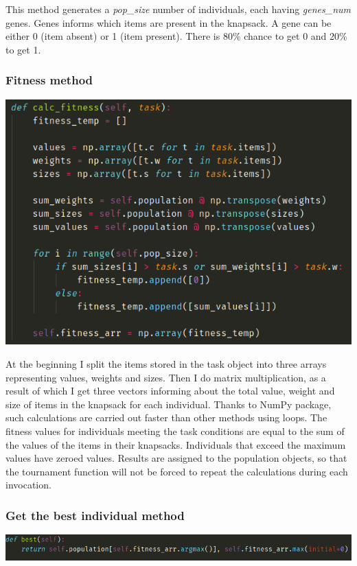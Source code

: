 \documentclass[12pt]{article}
\begin{document}
This method generates a \emph{pop\_size} number of individuals, each having \emph{genes\_num} genes. Genes informs which items are
 present in the knapsack. A gene can be either 0 (item absent) or 1 (item present). There is 80\% chance to get 0 and 20\% to get 1.

\subsubsection{Fitness method}
\begin{center}
	\includegraphics[scale=0.5]{pop_fitness}
\end{center}

At the beginning I split the items stored in the task object into three arrays representing values, weights and sizes. 
Then I do matrix multiplication, as a result of which I get three vectors informing about the total value, weight and size of items in
 the knapsack for each individual. Thanks to NumPy package, such calculations are carried out faster than other methods using loops. 
The fitness values for individuals meeting the task conditions are equal to the sum of the values of the items in their knapsacks.
 Individuals that exceed the maximum values have zeroed values. Results are assigned to the population objects, so that the tournament
  function will not be forced to repeat the calculations during each invocation.


\subsubsection{Get the best individual method}
\begin{center}
	\includegraphics[scale=0.5]{pop_best}
\end{center}
\end{document}
